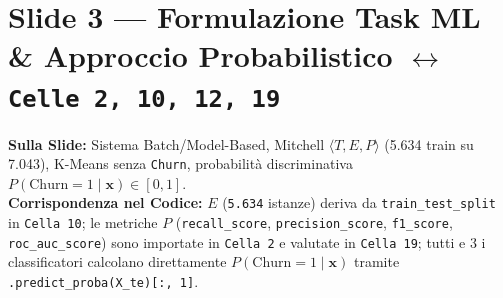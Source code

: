 \documentclass[10pt, a4paper]{article}
\begin{document}
\section*{Slide 3 --- Formulazione Task ML \& Approccio Probabilistico $\leftrightarrow$ \texttt{Celle 2, 10, 12, 19}}
\noindent\textbf{Sulla Slide:} Sistema Batch/Model-Based, Mitchell $\langle T,E,P\rangle$ (5.634 train su 7.043), K-Means senza \texttt{Churn}, probabilità discriminativa $P(\text{Churn}=1 \mid \mathbf{x}) \in [0,1]$.\\
\textbf{Corrispondenza nel Codice:} $E$ (\texttt{5.634} istanze) deriva da \texttt{train\_test\_split} in \texttt{Cella 10}; le metriche $P$ (\texttt{recall\_score}, \texttt{precision\_score}, \texttt{f1\_score}, \texttt{roc\_auc\_score}) sono importate in \texttt{Cella 2} e valutate in \texttt{Cella 19}; tutti e 3 i classificatori calcolano direttamente $P(\text{Churn}=1 \mid \mathbf{x})$ tramite \texttt{.predict\_proba(X\_te)[:, 1]}.
\end{document}
